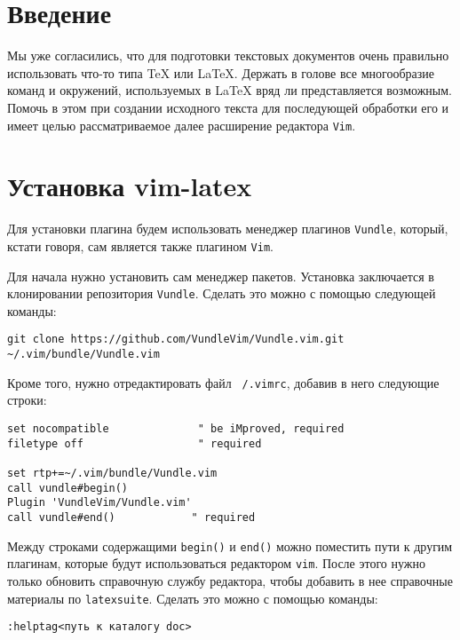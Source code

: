 \documentclass[a4paper]{article}
\begin{document}
\part{Введение}
Мы уже согласились, что для подготовки текстовых документов очень правильно
использовать что-то типа \TeX{} или \LaTeX. Держать в голове все многообразие
команд и окружений, используемых в \LaTeX{} вряд ли представляется возможным.
Помочь в этом при создании исходного текста для последующей обработки его 
 и имеет целью рассматриваемое далее расширение редактора \texttt{Vim}.
\part{Установка vim-latex}
Для установки плагина будем использовать менеджер плагинов \texttt{Vundle}, 
который, кстати говоря, сам является также плагином \texttt{Vim}.

Для начала нужно установить сам менеджер пакетов. Установка заключается в
клонировании репозитория \texttt{Vundle}. Сделать это можно с помощью следующей
команды:
\begin{verbatim}
git clone https://github.com/VundleVim/Vundle.vim.git ~/.vim/bundle/Vundle.vim
\end{verbatim}
Кроме того, нужно отредактировать файл \texttt{~/.vimrc}, добавив в него следующие
строки:
\begin{verbatim}
set nocompatible              " be iMproved, required
filetype off                  " required

set rtp+=~/.vim/bundle/Vundle.vim
call vundle#begin()
Plugin 'VundleVim/Vundle.vim'
call vundle#end()            " required
\end{verbatim}
Между строками содержащими \texttt{begin()} и \texttt{end()} можно поместить 
пути к другим плагинам, которые будут использоваться редактором \texttt{vim}.
После этого нужно только обновить справочную службу редактора, чтобы добавить
в нее справочные материалы по \texttt{latexsuite}. Сделать это можно с помощью
команды: \begin{verbatim}
:helptag<путь к каталогу doc>
\end{verbatim}
\end{document}

